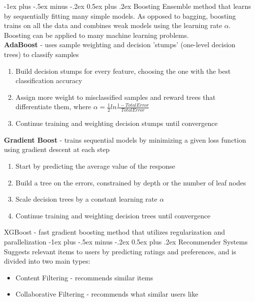 \documentclass[10pt,landscape]{article}
\makeatletter
\renewcommand{\section}{\@startsection{section}{1}{0mm}%
                                {-1ex plus -.5ex minus -.2ex}%
                                {0.5ex plus .2ex}%
                                {\normalfont\large\bfseries}}
\makeatother
\begin{document}
\begin{multicols}{3}
\section{Boosting} 
Ensemble method that learns by sequentially fitting many simple models. As opposed to bagging, boosting trains on all the data and combines weak models using the learning rate $\alpha$. Boosting can be applied to many machine learning problems.\\
\smallskip
\textbf{AdaBoost} - uses sample weighting and decision 'stumps' (one-level decision trees) to classify samples
\begin{enumerate}[leftmargin=5mm]
\itemsep -.4mm 
\item Build decision stumps for every feature, choosing the one with the best classification accuracy
\item Assign more weight to misclassified samples and reward trees that differentiate them, where  $\alpha = \frac{1}{2}ln\frac{1-TotalError}{TotalError}$
\item Continue training and weighting decision stumps until convergence
\end{enumerate}

\textbf{Gradient Boost} - trains sequential models by minimizing a given loss function using gradient descent at each step
\begin{enumerate}[leftmargin=5mm]
\itemsep -.4mm 
\item Start by predicting the average value of the response 
\item Build a tree on the errors, constrained by depth or the number of leaf nodes
\item Scale decision trees by a constant learning rate $\alpha$ 
\item Continue training and weighting decision trees until convergence
\end{enumerate}

XGBoost - fast gradient boosting method that utilizes regularization and parallelization
\section{Recommender Systems}
Suggests relevant items to users by predicting ratings and preferences, and is divided into two main types:
\begin{itemize}[label={--},leftmargin=4mm]
\itemsep -.4mm 
\item Content Filtering - recommends similar items 
\item Collaborative Filtering - recommends what similar users like 
\end{itemize}


\end{multicols}
\end{document}
